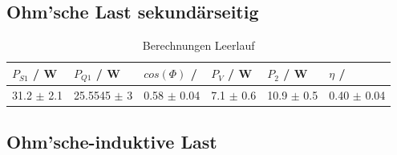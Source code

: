 \documentclass[12pt,a4paper,twoside]{article}
\begin{document}
\subsection{Ohm'sche Last sekundärseitig}

\begin{table}[H]
    \centering
    \caption{Berechnungen Leerlauf}
    \label{tab:BerechnungenLeerlaufAW}
    \begin{tabular}{| l | l | l | l | l | l |}
        \hline
        $P_{S1}$ / W & $P_{Q1}$ / W & $cos(\Phi)$ / & $P_{V}$ / W & $P_{2}$ / W & $\eta$ / \\
        \hline
        31.2 $\pm$ 2.1 & 25.5545 $\pm$ 3 & 0.58 $\pm$ 0.04 & 7.1 $\pm$ 0.6 & 10.9 $\pm$ 0.5 & 0.40 $\pm$ 0.04 \\
        \hline
    \end{tabular}
\end{table}


\subsection{Ohm'sche-induktive Last}
\end{document}
